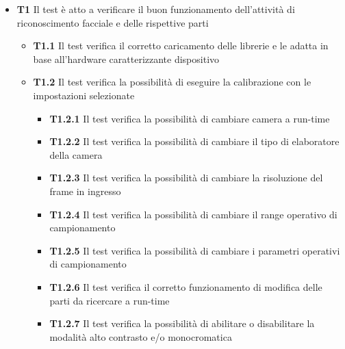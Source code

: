 \begin{itemize}
\item \textbf{T1} Il test è atto a verificare il buon funzionamento dell'attività di riconoscimento facciale e delle rispettive parti
\begin{itemize}
\item \textbf{T1.1} Il test verifica il corretto caricamento delle librerie e le adatta in base all'hardware caratterizzante dispositivo
\item \textbf{T1.2} Il test verifica la possibilità di eseguire la calibrazione con le
impostazioni selezionate
\begin{itemize}
\item \textbf{T1.2.1} Il test verifica la possibilità di cambiare camera a run-time
\item \textbf{T1.2.2} Il test verifica la possibilità di cambiare il tipo di elaboratore della camera
\item \textbf{T1.2.3} Il test verifica la possibilità di cambiare la risoluzione del frame in ingresso
\item \textbf{T1.2.4} Il test verifica la possibilità di cambiare il range operativo di campionamento
\item \textbf{T1.2.5} Il test verifica la possibilità di cambiare i parametri operativi di campionamento
\item \textbf{T1.2.6} Il test verifica il corretto funzionamento di modifica delle parti da ricercare a run-time
\item \textbf{T1.2.7} Il test verifica la possibilità di abilitare o disabilitare la modalità alto contrasto e/o monocromatica
\end{itemize}



\end{itemize}
\end{itemize}
